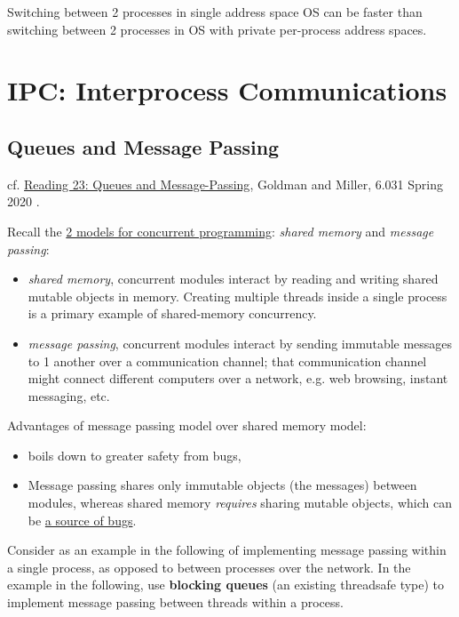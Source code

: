 \documentclass[10pt]{amsart}
\begin{document}
\begin{multicols*}{2}
Switching between 2 processes in single address space OS can be faster than switching between 2 processes in OS with private per-process address spaces.




\section{IPC: Interprocess Communications}

\subsection{Queues and Message Passing}

cf. \href{http://web.mit.edu/6.031/www/sp20/classes/23-queues/}{Reading 23: Queues and Message-Passing}, Goldman and Miller, 6.031 Spring 2020 \cite{6dot005and6dot031}. 

Recall the \href{http://web.mit.edu/6.031/www/sp20/classes/20-concurrency/#two_models_for_concurrent_programming}{2 models for concurrent programming}: \emph{shared memory} and \emph{message passing}:
\begin{itemize}
	\item \emph{shared memory}, concurrent modules interact by reading and writing shared mutable objects in memory. Creating multiple threads inside a single process is a primary example of shared-memory concurrency.
	\item \emph{message passing}, concurrent modules interact by sending immutable messages to 1 another over a communication channel; that communication channel might connect different computers over a network, e.g. web browsing, instant messaging, etc.
\end{itemize}

Advantages of message passing model over shared memory model:
\begin{itemize}
	\item boils down to greater safety from bugs,
	\item Message passing shares only immutable objects (the messages) between modules, whereas shared memory \emph{requires} sharing mutable objects, which can be \href{http://web.mit.edu/6.031/www/sp20/classes/08-immutability/#risks_of_mutation}{a source of bugs}.
\end{itemize}

Consider as an example in the following of implementing message passing within a single process, as opposed to between processes over the network. In the example in the following, use \textbf{blocking queues} (an existing threadsafe type) to implement message passing between threads within a process.


\end{multicols*}
\end{document}
